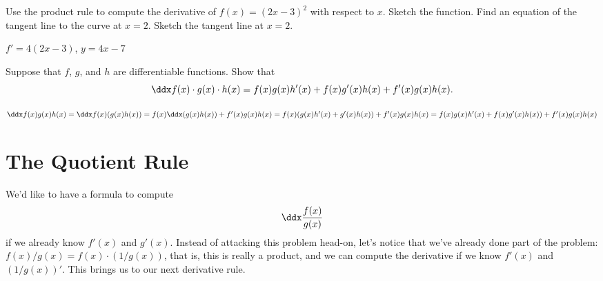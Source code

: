 \begin{exercises}
\endtwocol


\begin{exercise} 
Use the product rule to compute the derivative of $f(x)=(2x-3)^2$ with
respect to $x$.  Sketch the function.  Find an equation of the tangent
line to the curve at $x=2$.  Sketch the tangent line at $x=2$.
\begin{answer} $f'=4(2x-3)$, $y=4x-7$
\end{answer}\end{exercise}

\begin{exercise}
Suppose that $f$, $g$, and $h$ are differentiable functions.
Show that 
\[
\ddx f(x)\cdot g(x) \cdot h(x) = f(x) g(x)h'(x) + f(x)g'(x) h(x) + f'(x) g(x) h(x).
\]
\begin{answer}
$\ddx f(x)g(x)h(x) = \ddx f(x)(g(x)h(x)) = f(x) \ddx (g(x) h(x)) + f'(x) g(x) h(x) = f(x) (g(x) h'(x)+ g'(x)h(x)) + f'(x) g(x) h(x) = f(x)g(x)h'(x)+ f(x) g'(x)h(x)) + f'(x) g(x) h(x)$
\end{answer}
\end{exercise}
\end{exercises}





\section{The Quotient Rule}


We'd like to have a formula to compute
\[
\ddx \frac{f(x)}{g(x)}
\]
if we already know $f'(x)$ and $g'(x)$. Instead of attacking this
problem head-on, let's notice that we've already done part of the
problem: $f(x)/g(x)= f(x)\cdot(1/g(x))$, that is, this is really a
product, and we can compute the derivative if we know $f'(x)$ and
$(1/g(x))'$. This brings us to our next derivative rule.

